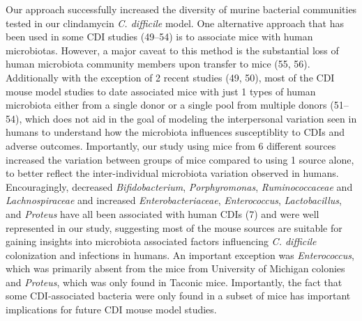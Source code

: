 \documentclass[11pt,]{article}
\begin{document}
Our approach successfully increased the diversity of murine bacterial
communities tested in our clindamycin \emph{C. difficile} model. One
alternative approach that has been used in some CDI studies (49--54) is
to associate mice with human microbiotas. However, a major caveat to
this method is the substantial loss of human microbiota community
members upon transfer to mice (55, 56). Additionally with the exception
of 2 recent studies (49, 50), most of the CDI mouse model studies to
date associated mice with just 1 types of human microbiota either from a
single donor or a single pool from multiple donors (51--54), which does
not aid in the goal of modeling the interpersonal variation seen in
humans to understand how the microbiota influences susceptiblity to CDIs
and adverse outcomes. Importantly, our study using mice from 6 different
sources increased the variation between groups of mice compared to using
1 source alone, to better reflect the inter-individual microbiota
variation observed in humans. Encouragingly, decreased
\emph{Bifidobacterium}, \emph{Porphyromonas}, \emph{Ruminococcaceae} and
\emph{Lachnospiraceae} and increased \emph{Enterobacteriaceae},
\emph{Enterococcus}, \emph{Lactobacillus}, and \emph{Proteus} have all
been associated with human CDIs (7) and were well represented in our
study, suggesting most of the mouse sources are suitable for gaining
insights into microbiota associated factors influencing \emph{C.
difficile} colonization and infections in humans. An important exception
was \emph{Enterococcus}, which was primarily absent from the mice from
University of Michigan colonies and \emph{Proteus}, which was only found
in Taconic mice. Importantly, the fact that some CDI-associated bacteria
were only found in a subset of mice has important implications for
future CDI mouse model studies.
\end{document}
